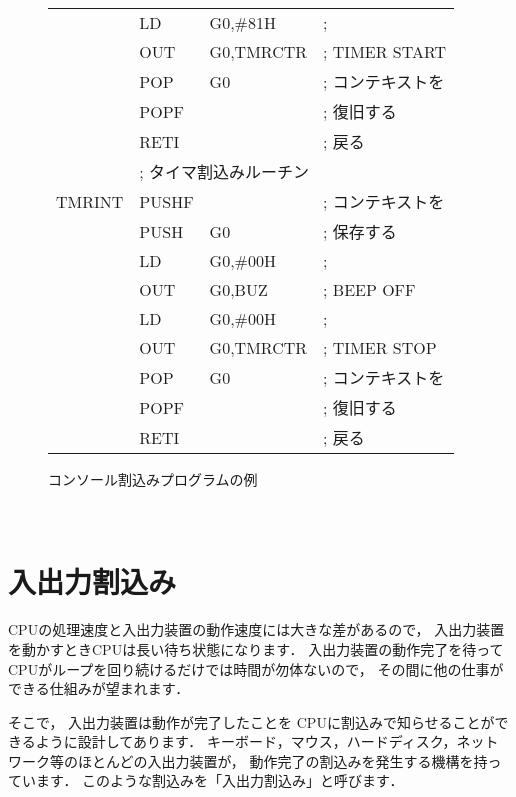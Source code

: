 \begin{figure}[bt]
{\begin{center}
\begin{tabular}{|l|l l l|}
       & LD     & G0,\#81H          & ;  \\
       & OUT    & G0,TMRCTR         & ; TIMER START  \\
       & POP    & G0                & ; コンテキストを  \\
       & POPF   &                   & ; 復旧する  \\
       & RETI   &                   & ; 戻る  \\
       & \multicolumn{3}{|l|}{; タイマ割込みルーチン}       \\
TMRINT & PUSHF  &                   & ; コンテキストを  \\
       & PUSH   & G0                & ; 保存する  \\
       & LD     & G0,\#00H          & ;   \\
       & OUT    & G0,BUZ            & ; BEEP OFF  \\
       & LD     & G0,\#00H          & ;  \\
       & OUT    & G0,TMRCTR         & ; TIMER STOP  \\
       & POP    & G0                & ; コンテキストを  \\
       & POPF   &                   & ; 復旧する  \\
       & RETI   &                   & ; 戻る  \\
\hline
\end{tabular}
\end{center}}
\caption{コンソール割込みプログラムの例}
\label{fig:chap6:cons}
\end{figure}

\newpage  %
~         %
\newpage
\section{入出力割込み}
\label{chap6:ioint}

CPUの処理速度と入出力装置の動作速度には大きな差があるので，
入出力装置を動かすときCPUは長い待ち状態になります．
入出力装置の動作完了を待って
CPUがループを回り続けるだけでは時間が勿体ないので，
その間に他の仕事ができる仕組みが望まれます．

そこで，
入出力装置は動作が完了したことを
CPUに割込みで知らせることができるように設計してあります．
キーボード，マウス，ハードディスク，ネットワーク等のほとんどの入出力装置が，
動作完了の割込みを発生する機構を持っています．
このような割込みを「入出力割込み」と呼びます．

